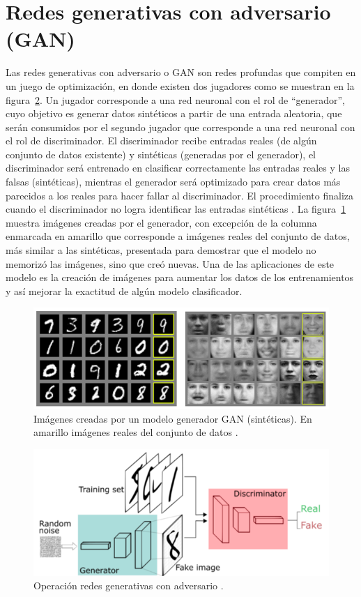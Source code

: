 \section{Redes generativas con adversario (GAN)}
Las redes generativas con adversario o GAN son redes profundas que compiten en un juego de optimización, en donde existen dos jugadores como se muestran en la figura~\ref{fig:gan2}. Un jugador corresponde a una red neuronal con el rol de “generador”, cuyo objetivo es generar datos sintéticos a partir de una entrada aleatoria, que serán consumidos por el segundo jugador que corresponde a una red neuronal con el rol de discriminador. El discriminador recibe entradas reales (de algún conjunto de datos existente) y sintéticas (generadas por el generador), el discriminador será entrenado en clasificar correctamente las entradas reales y las falsas (sintéticas), mientras el generador será optimizado para crear datos más parecidos a los reales para hacer fallar al discriminador. El procedimiento finaliza cuando el discriminador no logra identificar las entradas sintéticas \parencite{r42}. La figura~\ref{fig:gan1} muestra imágenes creadas por el generador, con excepción de la columna enmarcada en amarillo que corresponde a imágenes reales del conjunto de datos, más similar a las sintéticas, presentada para demostrar que el modelo no memorizó las imágenes, sino que creó nuevas. Una de las aplicaciones de este modelo es la creación de imágenes para aumentar los datos de los entrenamientos y así mejorar la exactitud de algún modelo clasificador.

\begin{figure}[th]
\centering
\includegraphics [scale = 0.85]{Figures/figura_09.PNG}
\decoRule
\caption[GAN] {Imágenes creadas por un modelo generador GAN (sintéticas). En amarillo imágenes reales del conjunto de datos \parencite{r42}.}
\label{fig:gan1}
\end{figure}

\begin{figure}[th]
\centering
\includegraphics [scale = 0.85]{Figures/figura_10.PNG}
\decoRule
\caption[GAN] {Operación redes generativas con adversario \parencite{r41}.}
\label{fig:gan2}
\end{figure}

